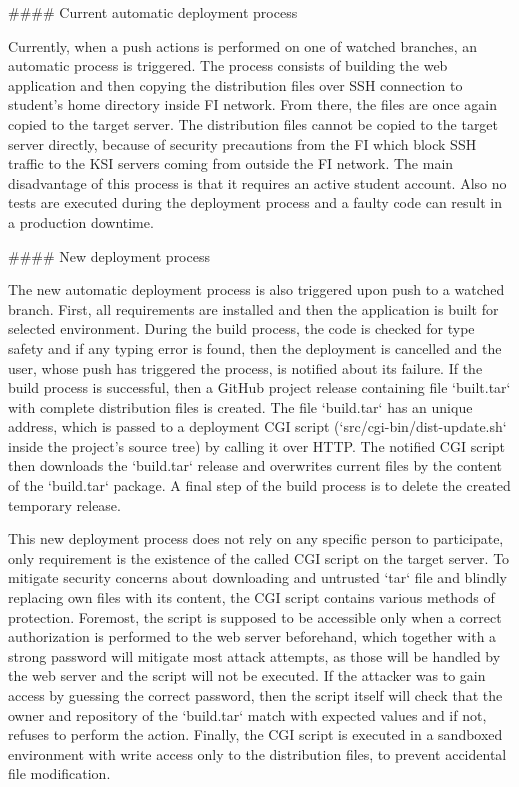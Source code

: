 \documentclass[
  digital, %
  oneside, %
  lof,     %
  lot,     %
]{fithesis4}
\begin{document}
{#### Current automatic deployment process

Currently, when a push actions is performed on one of watched branches, an automatic process is triggered. The process consists of building the web application and then copying the distribution files over SSH connection to student's home directory inside FI network. From there, the files are once again copied to the target server. The distribution files cannot be copied to the target server directly, because of security precautions from the FI which block SSH traffic to the KSI servers coming from outside the FI network. The main disadvantage of this process is that it requires an active student account. Also no tests are executed during the deployment process and a faulty code can result in a production downtime.

#### New deployment process

The new automatic deployment process is also triggered upon push to a watched branch. First, all requirements are installed and then the application is built for selected environment. During the build process, the code is checked for type safety and if any typing error is found, then the deployment is cancelled and the user, whose push has triggered the process, is notified about its failure. If the build process is successful, then a GitHub project release containing file `built.tar` with complete distribution files is created. The file `build.tar` has an unique address, which is passed to a deployment CGI script (`src/cgi-bin/dist-update.sh` inside the project's source tree) by calling it over HTTP. The notified CGI script then downloads the `build.tar` release and overwrites current files by the content of the `build.tar` package. A final step of the build process is to delete the created temporary release.

This new deployment process does not rely on any specific person to participate, only requirement is the existence of the called CGI script on the target server. To mitigate security concerns about downloading and untrusted `tar` file and blindly replacing own files with its content, the CGI script contains various methods of protection. Foremost, the script is supposed to be accessible only when a correct authorization is performed to the web server beforehand, which together with a strong password will mitigate most attack attempts, as those will be handled by the web server and the script will not be executed. If the attacker was to gain access by guessing the correct password, then the script itself will check that the owner and repository of the `build.tar` match with expected values and if not, refuses to perform the action. Finally, the CGI script is executed in a sandboxed environment with write access only to the distribution files, to prevent accidental file modification.

}
\end{document}
